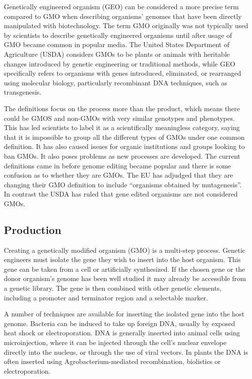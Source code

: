 Genetically engineered organism (GEO) can be considered a more precise term compared to GMO when describing organisms' genomes that have been directly manipulated with biotechnology. The term GMO originally was not typically used by scientists to describe genetically engineered organisms until after usage of GMO became common in popular media. The United States Department of Agriculture (USDA) considers GMOs to be plants or animals with heritable changes introduced by genetic engineering or traditional methods, while GEO specifically refers to organisms with genes introduced, eliminated, or rearranged using molecular biology, particularly recombinant DNA techniques, such as transgenesis.

The definitions focus on the process more than the product, which means there could be GMOS and non-GMOs with very similar genotypes and phenotypes. This has led scientists to label it as a scientifically meaningless category, saying that it is impossible to group all the different types of GMOs under one common definition. It has also caused issues for organic institutions and groups looking to ban GMOs. It also poses problems as new processes are developed. The current definitions came in before genome editing became popular and there is some confusion as to whether they are GMOs. The EU has adjudged that they are changing their GMO definition to include ``organisms obtained by mutagenesis''. In contrast the USDA has ruled that gene edited organisms are not considered GMOs.

\hypertarget{production}{%
\subsection{Production}\label{production}}

Creating a genetically modified organism (GMO) is a multi-step process. Genetic engineers must isolate the gene they wish to insert into the host organism. This gene can be taken from a cell or artificially synthesized. If the chosen gene or the donor organism's genome has been well studied it may already be accessible from a genetic library. The gene is then combined with other genetic elements, including a promoter and terminator region and a selectable marker.

A number of techniques are available for inserting the isolated gene into the host genome. Bacteria can be induced to take up foreign DNA, usually by exposed heat shock or electroporation. DNA is generally inserted into animal cells using microinjection, where it can be injected through the cell's nuclear envelope directly into the nucleus, or through the use of viral vectors. In plants the DNA is often inserted using Agrobacterium-mediated recombination, biolistics or electroporation.

